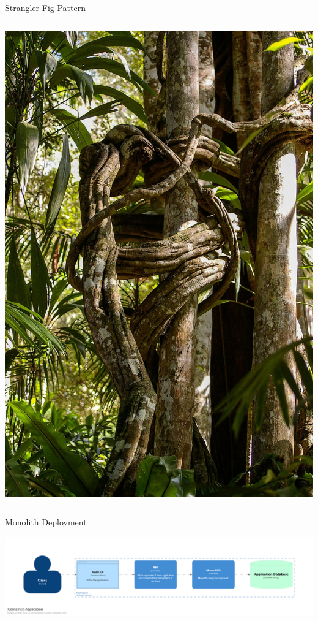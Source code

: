 \documentclass{slide}
\begin{document}
\begin{frame}{Strangler Fig Pattern}
\begin{columns}
        \includegraphics[height=0.9\textheight]{images/strangler-fig.jpg}
    \end{columns}
\end{frame}



\begin{frame}{Monolith Deployment}
    \begin{adjustwidth}{-12mm}{-12mm}
        \centering
        \includegraphics[trim=195 195 195 195,clip,width=0.97\paperwidth]{diagrams/decompose1.png}
    \end{adjustwidth}
\end{frame}
\end{document}
